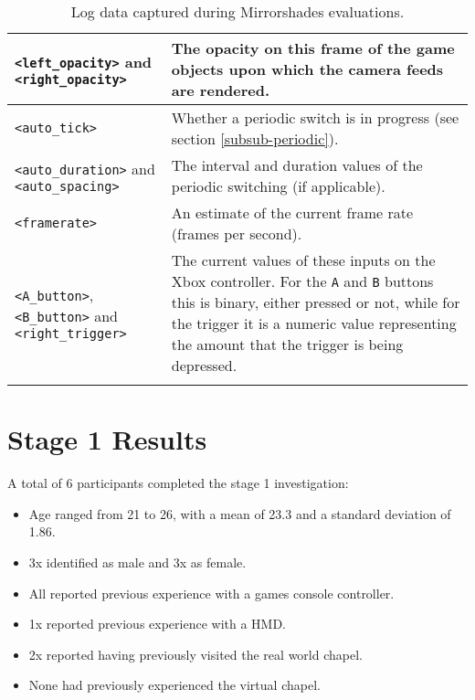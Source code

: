\begin{center}
\begin{longtable}{ l  p{6.5cm} }
\midrule

\texttt{<left\_opacity>} and \texttt{<right\_opacity>} & The opacity on this frame of the game objects upon which the camera feeds are rendered. \\

\midrule

\texttt{<auto\_tick>} & Whether a periodic switch is in progress (see section \ref{subsub-periodic}). \\

\midrule

\texttt{<auto\_duration>} and \texttt{<auto\_spacing>} & The interval and duration values of the periodic switching (if applicable). \\

\midrule

\texttt{<framerate>} & An estimate of the current frame rate (frames per second). \\

\midrule

\texttt{<A\_button>}, \texttt{<B\_button>} and \texttt{<right\_trigger>} & The current values of these inputs on the Xbox controller. For the \texttt{A} and \texttt{B} buttons this is binary, either pressed or not, while for the trigger it is a numeric value representing the amount that the trigger is being depressed. \\

\bottomrule
\caption{Log data captured during Mirrorshades evaluations.}
\label{logdatatable}
\end{longtable}
\end{center}


\section{Stage 1 Results}

A total of 6 participants completed the stage 1 investigation:
\begin{itemize}
	\item Age ranged from 21 to 26, with a mean of 23.3 and a standard deviation of 1.86.
	\item 3x identified as male and 3x as female.
	\item All reported previous experience with a games console controller.
	\item 1x reported previous experience with a HMD.
	\item 2x reported having previously visited the real world chapel.
	\item None had previously experienced the virtual chapel.
\end{itemize}


